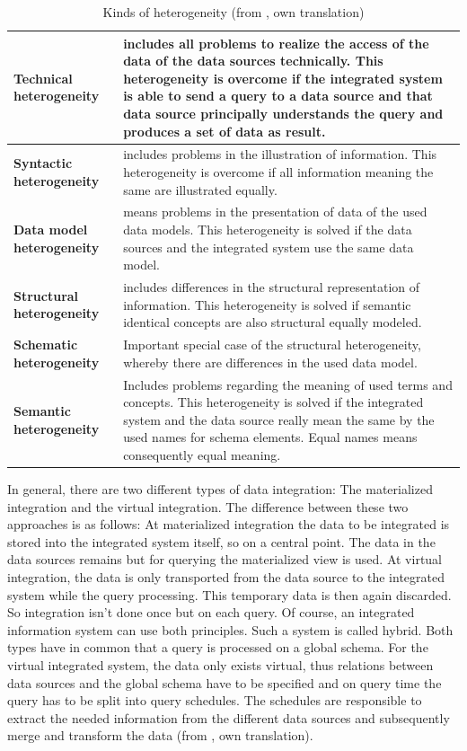 \begin{table}[]
\centering
\begin{tabular}{|l|p{}|}
\hline
 \textbf{Technical  heterogeneity}  &  includes all problems to realize the access of the data of the data sources technically. This heterogeneity is overcome if the integrated system is able to send a query to a data source and that data source principally understands the query and produces a set of data as result.\\ \hline
 \textbf{Syntactic  heterogeneity}    &  includes problems in the illustration of information. This heterogeneity is overcome if all information meaning the same are illustrated equally.\\ \hline
 \textbf{Data model  heterogeneity} &  means problems in the presentation of data of the used data models. This heterogeneity is solved if the data sources and the integrated system use the same data model.\\ \hline
 \textbf{Structural  heterogeneity}    &  includes differences in the structural representation of information. This heterogeneity is solved if semantic identical concepts are also structural equally modeled. \\ \hline
 \textbf{Schematic  heterogeneity} &  Important special case of the structural heterogeneity, whereby there are differences in the used data model.\\ \hline
 \textbf{Semantic  heterogeneity}    &  Includes problems regarding the meaning of used terms and concepts. This heterogeneity is solved if the integrated system and the data source really mean the same by the used names for schema elements. Equal names means consequently equal meaning.\\ \hline
\end{tabular}
\caption{Kinds of heterogeneity (from \cite[p. 60/61]{DBLP:books/dp/LeserN2006}, own translation)}
\label{kinds-of-heterogeneity}
\end{table}

In general, there are two different types of data integration: The materialized integration and the virtual integration. The difference between these two approaches is as follows: At materialized integration the data to be integrated is stored  into the integrated system itself, so on a central point. The data in the data sources remains but for querying the materialized view is used. At virtual integration, the data is only transported from the data source to the integrated system while the query processing. This temporary data is then again discarded. So integration isn't done once but on each query. Of course, an integrated information system can use both principles. Such a system is called hybrid. Both types have in common that a query is processed on a global schema. For the virtual integrated system, the data only exists virtual, thus relations between data sources and the global schema have to be specified and on query time the query has to be split into query schedules. The schedules are responsible to extract the needed information from the different data sources and subsequently merge and transform the data (from \cite[p. 86-88]{DBLP:books/dp/LeserN2006}, own translation).


